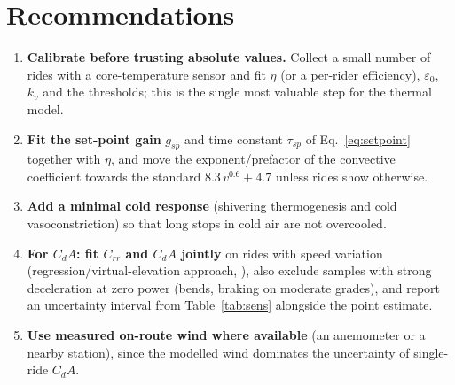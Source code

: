 \documentclass[11pt,a4paper]{article}
\newcommand{\CdA}{C_{\!d}A}
\begin{document}
\section{Recommendations}
\begin{enumerate}
 \item \textbf{Calibrate before trusting absolute values.} Collect a small number of rides with a core-temperature sensor and fit \(\eta\) (or a per-rider efficiency), \(\varepsilon_0\), \(k_v\) and the thresholds; this is the single most valuable step for the thermal model.
 \item \textbf{Fit the set-point gain} \(g_{sp}\) and time constant \(\tau_{sp}\) of Eq.~\eqref{eq:setpoint} together with \(\eta\), and move the exponent/prefactor of the convective coefficient towards the standard \(8.3\,v^{0.6}+4.7\) unless rides show otherwise.
 \item \textbf{Add a minimal cold response} (shivering thermogenesis and cold vasoconstriction) so that long stops in cold air are not overcooled.
 \item \textbf{For \(\CdA\): fit \(C_{rr}\) and \(\CdA\) jointly} on rides with speed variation (regression/virtual-elevation approach, \citealp{martin1998,chung}), also exclude samples with strong deceleration at zero power (bends, braking on moderate grades), and report an uncertainty interval from Table~\ref{tab:sens} alongside the point estimate.
 \item \textbf{Use measured on-route wind where available} (an anemometer or a nearby station), since the modelled wind dominates the uncertainty of single-ride \(\CdA\).
\end{enumerate}

\appendix
\end{document}
